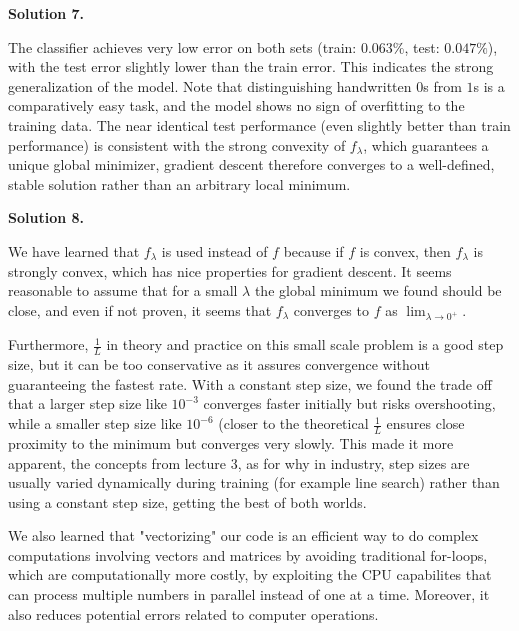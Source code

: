 \documentclass[12pt]{article}
\newcommand{\solution}[1]{\vspace{1em}\noindent \textbf{Solution #1.}\par}
\begin{document}
\solution{7}

The classifier achieves very low error on both sets (train: $0.063\%$, test: $0.047\%$), with the test error slightly lower than the train error. This indicates the strong generalization of the model. Note that distinguishing handwritten $0$s from $1$s is a comparatively easy task, and the model shows no sign of overfitting to the training data. The near identical test performance (even slightly better than train performance) is consistent with the strong convexity of $f_\lambda$, which guarantees a unique global minimizer, gradient descent therefore converges to a well-defined, stable solution rather than an arbitrary local minimum.

\solution{8}
We have learned that $f_\lambda$ is used instead of $f$ because if $f$ is convex, then $f_\lambda$ is strongly convex, which has nice properties for gradient descent. It seems reasonable to assume that for a small $\lambda$ the global minimum we found should be close, and even if not proven, it seems that $f_\lambda$ converges to $f$ as $\lim_{\lambda \to 0^+}$.

Furthermore, $\frac{1}{L}$ in theory and practice on this small scale problem is a good step size, but it can be too conservative as it assures convergence without guaranteeing the fastest rate. With a constant step size, we found the trade off that a larger step size like $10^{-3}$ converges faster initially but risks overshooting, while a smaller step size like $10^{-6}$ (closer to the theoretical $\frac{1}{L}$ ensures close proximity to the minimum but converges very slowly. This made it more apparent, the concepts from lecture 3, as for why in industry, step sizes are usually varied dynamically during training (for example line search) rather than using a constant step size, getting the best of both worlds.

We also learned that "vectorizing" our code is an efficient way to do complex computations involving vectors and matrices by avoiding traditional for-loops, which are computationally more costly, by exploiting the CPU capabilites that can process multiple numbers in parallel instead of one at a time. Moreover, it also reduces potential errors related to computer operations.
\end{document}
